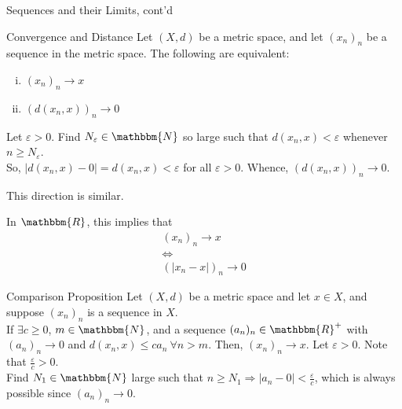 \documentclass[10pt]{extarticle}
\newcommand{\N}{\mathbbm{N}}
\newcommand{\R}{\mathbbm{R}}
\begin{document}
  \begin{problem}{Sequences and their Limits, cont'd}
    \begin{problem}{Convergence and Distance}
      Let $(X,d)$ be a metric space, and let $(x_n)_n$ be a sequence in the metric space. The following are equivalent:
      \begin{enumerate}[(i)]
        \item $(x_n)_n\rightarrow x$
        \item $\left(d(x_n,x)\right)_n \rightarrow 0$
      \end{enumerate}
      \tcblower
      \begin{description}[font=\normalfont]
        \item[(i) $\Rightarrow$ (b)] Let $\varepsilon > 0$. Find $N_{\varepsilon}\in\N$ so large such that $d(x_n,x) < \varepsilon$ whenever $n \geq N_{\varepsilon}$.\\

          So, $|d(x_n,x)-0| = d(x_n,x) < \varepsilon$ for all $\varepsilon > 0$. Whence, $\left(d(x_n,x)\right)_n \rightarrow 0$.
        \item[(ii) $\Rightarrow$ (i)] This direction is similar.
      \end{description}
    \end{problem}
    In $\R$, this implies that
    \begin{align*}
      (x_n)_n \rightarrow x\\
      \Leftrightarrow\\
      (|x_n -x|)_n \rightarrow 0
    \end{align*}
    \begin{problem}{Comparison Proposition}
      Let $(X,d)$ be a metric space and let $x\in X$, and suppose $(x_n)_n$ is a sequence in $X$.\\

      If $\exists c\geq 0$, $m\in\N$, and a sequence $(a_n)_n\in\R^+$ with $(a_n)_n \rightarrow 0$ and $d(x_n,x) \leq c a_n~\forall n > m$. Then, $(x_n)_n\rightarrow x$.
      \tcblower
      Let $\varepsilon > 0$. Note that $\frac{\varepsilon}{c} > 0$.\\

      Find $N_1\in \N$ large such that $n \geq N_1 \Rightarrow |a_n - 0| < \frac{\varepsilon}{c}$, which is always possible since $(a_n)_n \rightarrow 0$.\\


\end{problem}
\end{problem}
\end{document}
